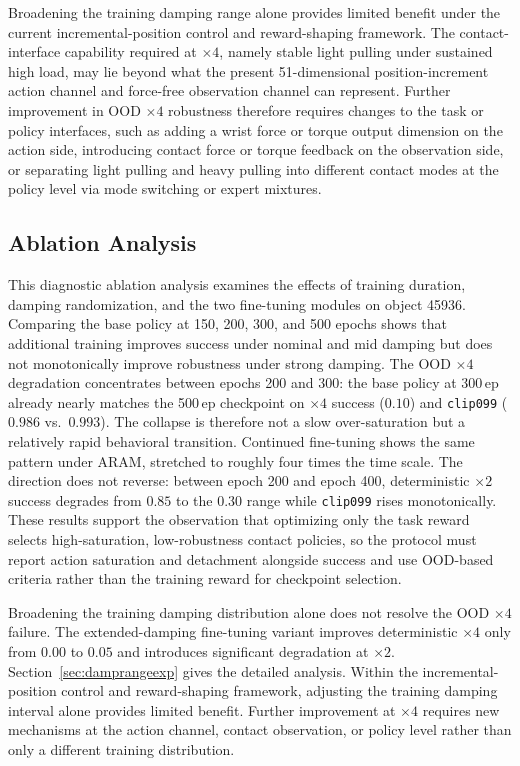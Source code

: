 \documentclass{llmxive}
\begin{document}
Broadening the training damping range alone provides limited benefit
under the current incremental-position control and reward-shaping
framework. The contact-interface capability required at $\times4$, namely
stable light pulling under sustained high load, may lie beyond what
the present 51-dimensional position-increment action channel and
force-free observation channel can represent. Further improvement in
OOD $\times4$ robustness therefore requires changes to the task or policy
interfaces, such as adding a wrist force or torque output dimension
on the action side, introducing contact force or torque feedback on
the observation side, or separating light pulling and heavy pulling
into different contact modes at the policy level via mode switching
or expert mixtures.


\subsection{Ablation Analysis}
\label{sec:ablation}

This diagnostic ablation analysis examines the effects of training
duration, damping randomization, and the two fine-tuning modules on
object 45936. Comparing
the base policy at 150, 200, 300, and 500 epochs shows that additional
training improves success under nominal and mid damping but does not
monotonically improve robustness under strong damping. The OOD $\times4$
degradation concentrates between epochs 200 and 300:
the base policy at 300\,ep already nearly matches the 500\,ep checkpoint on
$\times4$ success ($0.10$) and \texttt{clip099} ($0.986$ vs.~$0.993$).
The collapse is therefore not a slow over-saturation but a
relatively rapid behavioral transition. Continued fine-tuning shows
the same pattern under ARAM, stretched to roughly four times the
time scale. The direction does not reverse: between
epoch 200 and epoch 400, deterministic $\times2$ success
degrades from $0.85$ to the $0.30$ range while \texttt{clip099}
rises monotonically. These results support the observation that
optimizing only the task reward selects high-saturation,
low-robustness contact policies, so the protocol must report action
saturation and detachment alongside success and use OOD-based
criteria rather than the training reward for checkpoint selection.

Broadening the training damping distribution alone does not resolve
the OOD $\times4$ failure. The extended-damping fine-tuning variant
improves deterministic $\times4$ only from $0.00$ to $0.05$ and
introduces significant degradation at $\times2$. Section~\ref{sec:damprangeexp}
gives the detailed analysis. Within the incremental-position control
and reward-shaping framework, adjusting the training damping
interval alone provides limited benefit. Further improvement at
$\times4$ requires new mechanisms at the action channel, contact
observation, or policy level rather than only a different training
distribution.
\end{document}
